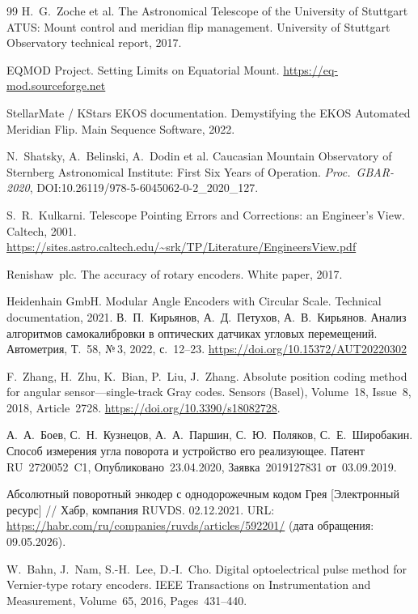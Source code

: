 \documentclass[14pt,a4paper]{extarticle}
\begin{document}
\begin{thebibliography}{99}
H.~G.~Zoche et al.
The Astronomical Telescope of the University of Stuttgart ATUS:
Mount control and meridian flip management.
University of Stuttgart Observatory technical report, 2017.

EQMOD Project.
Setting Limits on Equatorial Mount.
\url{https://eq-mod.sourceforge.net}

StellarMate / KStars EKOS documentation.
Demystifying the EKOS Automated Meridian Flip.
Main Sequence Software, 2022.

N.~Shatsky, A.~Belinski, A.~Dodin et al.
Caucasian Mountain Observatory of Sternberg Astronomical Institute:
First Six Years of Operation.
\textit{Proc.\ GBAR-2020}, DOI:10.26119/978-5-6045062-0-2\_2020\_127.

S.~R.~Kulkarni.
Telescope Pointing Errors and Corrections:
an Engineer's View.
Caltech, 2001.
\url{https://sites.astro.caltech.edu/~srk/TP/Literature/EngineersView.pdf}

Renishaw~plc.
The accuracy of rotary encoders.
White paper, 2017.

Heidenhain GmbH.
Modular Angle Encoders with Circular Scale.
Technical documentation, 2021.
В.~П.~Кирьянов, А.~Д.~Петухов, А.~В.~Кирьянов.
Анализ алгоритмов самокалибровки в оптических датчиках угловых перемещений.
Автометрия, Т.~58, №\,3, 2022, с.~12--23.
\url{https://doi.org/10.15372/AUT20220302}

F.~Zhang, H.~Zhu, K.~Bian, P.~Liu, J.~Zhang.
Absolute position coding method for angular sensor—single-track Gray codes.
Sensors (Basel),
Volume~18, Issue~8,
2018,
Article~2728.
\url{https://doi.org/10.3390/s18082728}.

А.~А.~Боев, С.~Н.~Кузнецов, А.~А.~Паршин, С.~Ю.~Поляков, С.~Е.~Широбакин.
Способ измерения угла поворота и устройство его реализующее.
Патент RU~2720052~C1,
Опубликовано~23.04.2020,
Заявка~2019127831 от~03.09.2019.

Абсолютный поворотный энкодер с однодорожечным кодом Грея [Электронный ресурс] // Хабр, компания RUVDS.
02.12.2021.
URL: \url{https://habr.com/ru/companies/ruvds/articles/592201/} (дата обращения: 09.05.2026).

W.~Bahn, J.~Nam, S.-H.~Lee, D.-I.~Cho.
Digital optoelectrical pulse method for Vernier-type rotary encoders.
IEEE Transactions on Instrumentation and Measurement,
Volume~65,
2016,
Pages~431--440.


\end{thebibliography}
\end{document}
